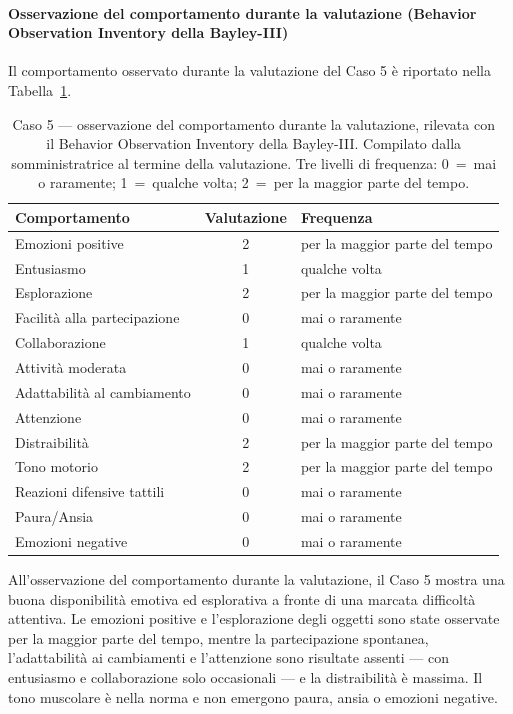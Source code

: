  \paragraph*{Osservazione del comportamento durante la valutazione (Behavior Observation Inventory della Bayley-III)}

Il comportamento osservato durante la valutazione del Caso 5 è riportato nella Tabella~\ref{tab:caso5_boi}.

\begin{table}[htbp]
\centering
\caption[Caso 5 --- osservazione del comportamento durante la valutazione]{Caso 5 --- osservazione del comportamento durante la valutazione, rilevata con il Behavior Observation Inventory della Bayley-III. Compilato dalla somministratrice al termine della valutazione. Tre livelli di frequenza: 0~=~mai o raramente; 1~=~qualche volta; 2~=~per la maggior parte del tempo.}
\label{tab:caso5_boi}
\begin{tabular}{|l|c|l|}
\toprule
\textbf{Comportamento} & \textbf{Valutazione} & \textbf{Frequenza} \\
\midrule
Emozioni positive & 2 & per la maggior parte del tempo \\
Entusiasmo & 1 & qualche volta \\
Esplorazione & 2 & per la maggior parte del tempo \\
Facilità alla partecipazione & 0 & mai o raramente \\
Collaborazione & 1 & qualche volta \\
Attività moderata & 0 & mai o raramente \\
Adattabilità al cambiamento & 0 & mai o raramente \\
Attenzione & 0 & mai o raramente \\
Distraibilità & 2 & per la maggior parte del tempo \\
Tono motorio & 2 & per la maggior parte del tempo \\
Reazioni difensive tattili & 0 & mai o raramente \\
Paura/Ansia & 0 & mai o raramente \\
Emozioni negative & 0 & mai o raramente \\
\bottomrule
\end{tabular}
\end{table}

All'osservazione del comportamento durante la valutazione, il Caso 5 mostra una buona disponibilità emotiva ed esplorativa a fronte di una marcata difficoltà attentiva. Le emozioni positive e l'esplorazione degli oggetti sono state osservate per la maggior parte del tempo, mentre la partecipazione spontanea, l'adattabilità ai cambiamenti e l'attenzione sono risultate assenti --- con entusiasmo e collaborazione solo occasionali --- e la distraibilità è massima. Il tono muscolare è nella norma e non emergono paura, ansia o emozioni negative.

